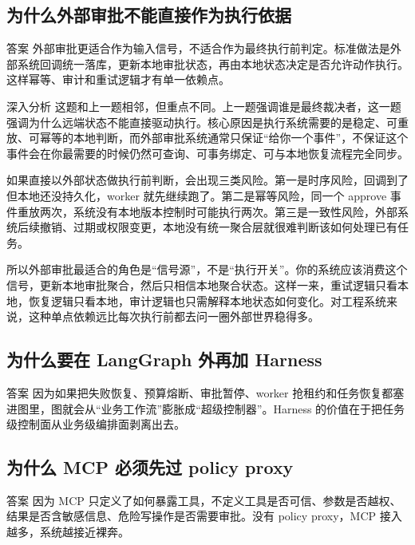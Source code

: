 \documentclass[12pt]{article}
\begin{document}
\subsection{为什么外部审批不能直接作为执行依据}
\begin{qaBox}{答案}
外部审批更适合作为输入信号，不适合作为最终执行前判定。标准做法是外部系统回调统一落库，更新本地审批状态，再由本地状态决定是否允许动作执行。这样幂等、审计和重试逻辑才有单一依赖点。
\end{qaBox}

\begin{analysisBox}{深入分析}
这题和上一题相邻，但重点不同。上一题强调谁是最终裁决者，这一题强调为什么远端状态不能直接驱动执行。核心原因是执行系统需要的是稳定、可重放、可幂等的本地判断，而外部审批系统通常只保证“给你一个事件”，不保证这个事件会在你最需要的时候仍然可查询、可事务绑定、可与本地恢复流程完全同步。

如果直接以外部状态做执行前判断，会出现三类风险。第一是时序风险，回调到了但本地还没持久化，worker 就先继续跑了。第二是幂等风险，同一个 approve 事件重放两次，系统没有本地版本控制时可能执行两次。第三是一致性风险，外部系统后续撤销、过期或权限变更，本地没有统一聚合层就很难判断该如何处理已有任务。

所以外部审批最适合的角色是“信号源”，不是“执行开关”。你的系统应该消费这个信号，更新本地审批聚合，然后只相信本地聚合状态。这样一来，重试逻辑只看本地，恢复逻辑只看本地，审计逻辑也只需解释本地状态如何变化。对工程系统来说，这种单点依赖远比每次执行前都去问一圈外部世界稳得多。
\end{analysisBox}

\subsection{为什么要在 LangGraph 外再加 Harness}
\begin{qaBox}{答案}
因为如果把失败恢复、预算熔断、审批暂停、worker 抢租约和任务恢复都塞进图里，图就会从“业务工作流”膨胀成“超级控制器”。Harness 的价值在于把任务级控制面从业务级编排面剥离出去。
\end{qaBox}

\subsection{为什么 MCP 必须先过 policy proxy}
\begin{qaBox}{答案}
因为 MCP 只定义了如何暴露工具，不定义工具是否可信、参数是否越权、结果是否含敏感信息、危险写操作是否需要审批。没有 policy proxy，MCP 接入越多，系统越接近裸奔。
\end{qaBox}
\end{document}
